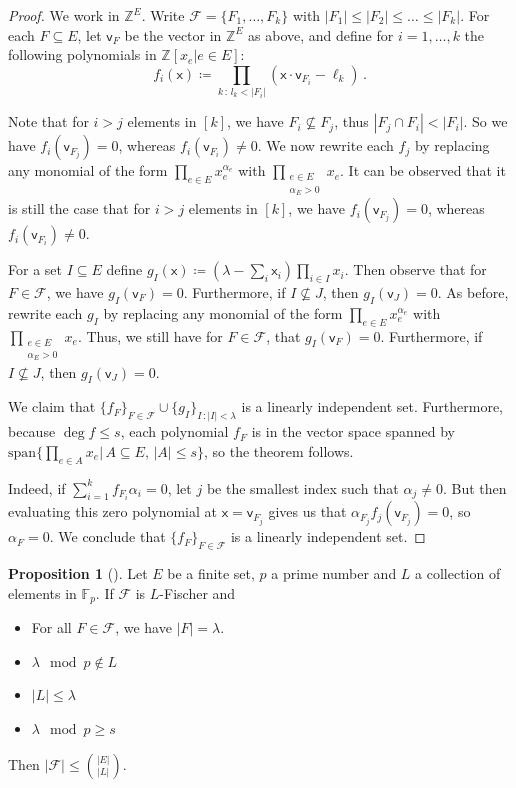 \documentclass[12pt]{amsart}
\theoremstyle{definition}
\newtheorem{prop}[thm]{Proposition}
\newcommand{\Z}{\mathbb{Z}}
\newcommand{\F}{\mathbb{F}}
\newcommand{\FF}{\mathcal F}
\newcommand{\vv}{\mathsf{v}}
\newcommand{\vx}{\mathsf{x}}
\newcommand{\spn}{\mathrm{span}}
\begin{document}
\begin{proof}
We work in $\Z^E$.
Write $\FF = \{F_1, \ldots , F_k\}$ with $|F_1| \leq |F_2| \leq \ldots \leq |F_k|$.
For each $F \subseteq E$, let $\vv_F$ be the vector in $\Z^E$ as above, and define for $i= 1, \ldots , k$ the following polynomials in $\Z[x_e | e \in E]$:
$$f_i(\vx) \coloneqq \prod_{k \, : \, l_k < |F_i|} (\vx \cdot \vv_{F_i} - \ell_k ) \, .$$

Note that for $i > j $ elements in $[k]$, we have $F_i \not\subseteq F_j$, thus $|F_j \cap F_i| <  |F_i|$.
So we have $f_i(\vv_{F_j}) = 0$, whereas $f_i(\vv_{F_i}) \neq 0$.
We now rewrite each $f_j$ by replacing any monomial of the form $\prod_{e\in E}x_e^{\alpha_e}$ with $\prod_{\substack{e\in E\\ \alpha_E > 0}}x_e$.
It can be observed that it is still the case that for $i > j $ elements in $[k]$, we have $f_i(\vv_{F_j}) = 0$, whereas $f_i(\vv_{F_i}) \neq 0$.

For a set $I \subseteq E$ define $g_I (\vx) \coloneqq (\lambda - \sum_i \vx_i)\prod_{i \in I} x_i$.
Then observe that for $F \in \FF$, we have $g_I(\vv_F) = 0$.
Furthermore, if $I \not \subseteq J$, then $g_I(\vv_J) = 0$.
As before, rewrite each $g_I$ by replacing any monomial of the form $\prod_{e\in E}x_e^{\alpha_e}$ with $\prod_{\substack{e\in E\\ \alpha_E > 0}}x_e$.
Thus, we still have for $F \in \FF$, that $g_I(\vv_F) = 0$.
Furthermore, if $I \not \subseteq J$, then $g_I(\vv_J) = 0$.

We claim that $\{ f_F \}_{F \in \FF}\cup \{g_I \}_{I \, : |I| < \lambda }$ is a linearly independent set.
Furthermore, because $\deg f \leq s$, each polynomial $f_F$ is in the vector space spanned by $\spn\{\prod_{e \in A} x_e | \, A \subseteq E, \, |A| \leq s \}$, so the theorem follows.

Indeed, if $\sum_{i = 1}^k f_{F_i} \alpha_i =0$, let $j$ be the smallest index such that $\alpha_j \neq 0$.
But then evaluating this zero polynomial at $\vx = \vv_{F_j} $ gives us that $\alpha_{F_j} f_j(\vv_{F_j}) = 0$, so $\alpha_F = 0$. 
We conclude that $\{ f_F \}_{F \in \FF}$ is a linearly independent set.
\end{proof}


\begin{prop}[]
Let $E$ be a finite set, $p$ a prime number and $L$ a collection of elements in $\F_p$.
If $\FF$ is $L$-Fischer and
\begin{itemize}
\item For all $F\in \FF$, we have $|F|= \lambda$.

\item $\lambda \mod p\not\in L$

\item $|L| \leq \lambda $

\item $\lambda \mod p \geq s$
\end{itemize}

Then $|\FF| \leq \binom{|E|}{|L|}$.
\end{prop}
\end{document}
